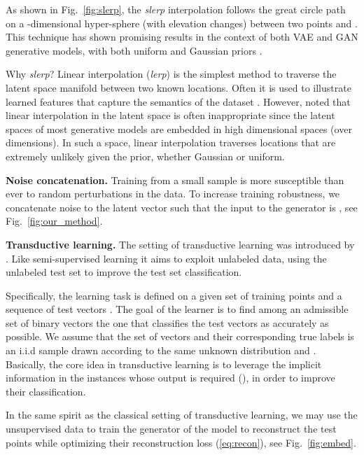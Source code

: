 \documentclass[a4paper,conference]{IEEEtran}
\begin{document}
As shown in Fig.~\ref{fig:slerp}, the \emph{slerp} interpolation follows the great circle path on a -dimensional hyper-sphere (with elevation changes) between two points  and . This technique has shown promising results in the context of both VAE and GAN generative models, with both uniform and Gaussian priors \cite{SamplingGenerativeNetworks}.

Why \emph{slerp}? Linear interpolation (\emph{lerp}) is the simplest method to traverse the latent space manifold between two known locations. Often it is used to illustrate learned features that capture the semantics of the dataset \cite{NIPS2012_4824}. However, \cite{arvanitidis2017latent} noted that linear interpolation in the latent space is often inappropriate since the latent spaces of most generative models are embedded in high dimensional spaces (over  dimensions). In such a space, linear interpolation traverses locations that are extremely unlikely given the prior, whether Gaussian or uniform.

\textbf{Noise concatenation.} Training from a small sample is more susceptible than ever to random perturbations in the data. To increase training robustness, we concatenate noise to the latent vector such that the input to the generator  is , see Fig.~\ref{fig:our_method}.


		
\textbf{Transductive learning.}
The setting of transductive learning was introduced by \cite{vapnik1998statistical}. Like semi-supervised learning it aims to exploit unlabeled data, using the unlabeled test set to improve the test set classification.

Specifically, the learning task is defined on a given set of  training points  and a sequence of  test vectors . The goal of the learner is to find among an admissible set of binary vectors the one that classifies the test vectors as accurately as possible. We assume that the set of vectors  and their corresponding true labels is an i.i.d sample drawn according to the same unknown distribution  and . Basically, the core idea in transductive learning is to leverage the implicit information in the instances whose output is required (), in order to improve their classification.
		
In the same spirit as the classical setting of transductive learning, we may use the unsupervised data to train the generator of the model to reconstruct the test points while optimizing their reconstruction loss (\ref{eq:recon}), see Fig.~\ref{fig:embed}. 
		
\end{document}
